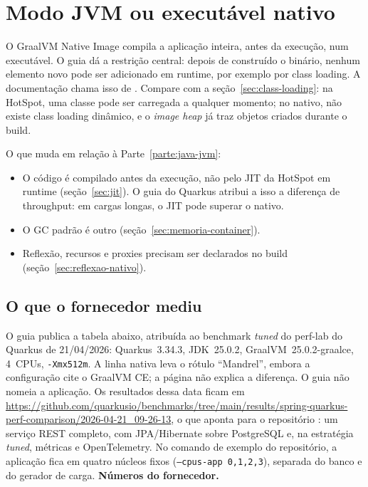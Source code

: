 \section{Modo JVM ou executável nativo}
\label{sec:jvm-vs-nativo}

O GraalVM Native Image compila a aplicação inteira, antes da execução,
num executável. O guia  dá a
restrição central: depois de construído o binário, nenhum elemento novo
pode ser adicionado em runtime, por exemplo por class loading. A
documentação chama isso de .
Compare com a seção~\ref{sec:class-loading}: na HotSpot, uma classe pode
ser carregada a qualquer momento; no nativo, não existe class loading
dinâmico, e o \emph{image heap} já traz objetos criados durante o build.

O que muda em relação à Parte~\ref{parte:java-jvm}:
\begin{itemize}
\item O código é compilado antes da execução, não pelo JIT da HotSpot
  em runtime (seção~\ref{sec:jit}). O guia do Quarkus atribui a isso a
  diferença de throughput: em cargas longas, o JIT pode superar o
  nativo.
\item O GC padrão é outro (seção~\ref{sec:memoria-container}).
\item Reflexão, recursos e proxies precisam ser declarados no build
  (seção~\ref{sec:reflexao-nativo}).
\end{itemize}

\subsection*{O que o fornecedor mediu}

O guia  publica a tabela abaixo,
atribuída ao benchmark \emph{tuned} do perf-lab do Quarkus de
21/04/2026: Quarkus~3.34.3, JDK~25.0.2, GraalVM~25.0.2-graalce, 4~CPUs,
\texttt{-Xmx512m}. A linha nativa leva o rótulo \enquote{Mandrel},
embora a configuração cite o GraalVM CE; a página não explica a
diferença. O guia não nomeia a aplicação. Os resultados dessa data
ficam em
\url{https://github.com/quarkusio/benchmarks/tree/main/results/spring-quarkus-perf-comparison/2026-04-21_09-26-13},
o que aponta para o repositório :
um serviço REST completo, com JPA/Hibernate sobre PostgreSQL e, na
estratégia \emph{tuned}, métricas e OpenTelemetry. No comando de exemplo
do repositório, a aplicação fica em quatro núcleos fixos
(\texttt{--cpus-app 0,1,2,3}), separada do banco e do gerador de carga.
\textbf{Números do fornecedor.}

